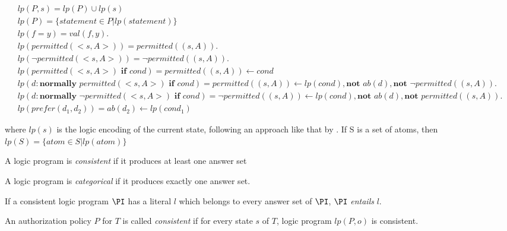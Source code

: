 \begin{gather*}
    lp(P,s) = lp(P)\cup lp(s) \\
    lp(P)=\{statement \in P | lp(statement)\} \\
    lp\left(f=y\right) =
        val\left(f,y\right). \\
    lp(permitted(<s,A>)) =
        permitted((s,A)). \\
    lp(\neg permitted(<s, A>)) =
        \neg permitted((s, A)). \\
    lp(permitted(<s, A>) \textbf{ if } cond) =
        permitted((s,A)) \leftarrow
            cond \\
    lp(d: \textbf{normally } permitted(<s, A>) \textbf{ if } cond) =
        permitted((s,A)) \leftarrow
            lp(cond),
            \textbf{not } ab(d),
            \textbf{not } \neg permitted((s, A)). \\
    lp(d: \textbf{normally } \neg permitted(<s, A>) \textbf{ if } cond) =
        \neg permitted((s,A)) \leftarrow
            lp(cond),
            \textbf{not } ab(d),
            \textbf{not } permitted((s, A)). \\
    lp(prefer(d_1, d_2)) =
        ab(d_2) \leftarrow lp(cond_1)
\end{gather*}

\noindent
where $lp(s)$ is the logic encoding of the current state, following an approach like that by \citet{balduccini_aaa_2008}.
If S is a set of atoms, then $lp(S)=\{atom \in S | lp(atom)\}$

\begin{definition}
    A logic program is \textit{consistent} if it produces at least one answer set
\end{definition}

\begin{definition}
    A logic program is \textit{categorical} if it produces exactly one answer set.
\end{definition}

\begin{definition}
    If a consistent logic program $\PI$ has a literal $l$ which belongs to every answer set of $\PI$, $\PI$ \textit{entails} $l$.
\end{definition}

\begin{definition}
    An authorization policy $P$ for $T$ is called \textit{consistent} if for every state $s$ of $T$, logic program $lp(P, o)$ is consistent.
\end{definition}

